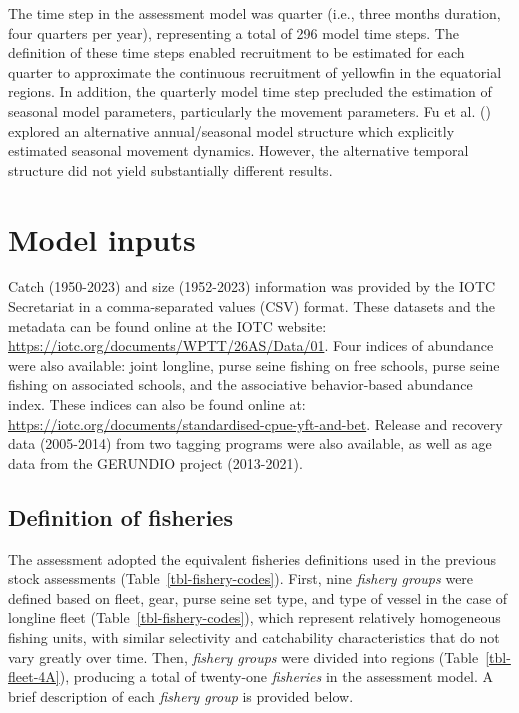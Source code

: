 \documentclass[
]{scrartcl}
\begin{document}
The time step in the assessment model was quarter (i.e., three months
duration, four quarters per year), representing a total of 296 model
time steps. The definition of these time steps enabled recruitment to be
estimated for each quarter to approximate the continuous recruitment of
yellowfin in the equatorial regions. In addition, the quarterly model
time step precluded the estimation of seasonal model parameters,
particularly the movement parameters. Fu et al.
() explored an
alternative annual/seasonal model structure which explicitly estimated
seasonal movement dynamics. However, the alternative temporal structure
did not yield substantially different results.

\section{Model inputs}\label{model-inputs}

Catch (1950-2023) and size (1952-2023) information was provided by the
IOTC Secretariat in a comma-separated values (CSV) format. These
datasets and the metadata can be found online at the IOTC website:
\url{https://iotc.org/documents/WPTT/26AS/Data/01}. Four indices of
abundance were also available: joint longline, purse seine fishing on
free schools, purse seine fishing on associated schools, and the
associative behavior-based abundance index. These indices can also be
found online at:
\url{https://iotc.org/documents/standardised-cpue-yft-and-bet}. Release
and recovery data (2005-2014) from two tagging programs were also
available, as well as age data from the GERUNDIO project (2013-2021).

\subsection{Definition of fisheries}\label{definition-of-fisheries}

The assessment adopted the equivalent fisheries definitions used in the
previous stock assessments (Table~\ref{tbl-fishery-codes}). First, nine
\emph{fishery groups} were defined based on fleet, gear, purse seine set
type, and type of vessel in the case of longline fleet
(Table~\ref{tbl-fishery-codes}), which represent relatively homogeneous
fishing units, with similar selectivity and catchability characteristics
that do not vary greatly over time. Then, \emph{fishery groups} were
divided into regions (Table~\ref{tbl-fleet-4A}), producing a total of
twenty-one \emph{fisheries} in the assessment model. A brief description
of each \emph{fishery group} is provided below.
\end{document}
